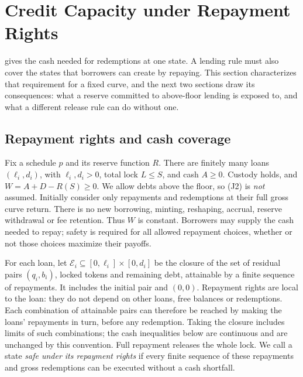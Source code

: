 \section{Credit Capacity under Repayment Rights}\label{sec:credit}

 gives the cash needed for redemptions at one state. A lending rule must also cover the states that borrowers can create by repaying. This section characterizes that requirement for a fixed curve, and the next two sections draw its consequences: what a reserve committed to above-floor lending is exposed to, and what a different release rule can do without one.

\subsection{Repayment rights and cash coverage}\label{cr:rights}

Fix a schedule $p$ and its reserve function $R$. There are finitely many loans $(\ell_i,d_i)$, with $\ell_i,d_i>0$, total lock $L\le S$, and cash $A\ge0$. Custody holds, and $W=A+D-R(S)\ge0$. We allow debts above the floor, so (J2) is \emph{not} assumed. Initially consider only repayments and redemptions at their full gross curve return. There is no new borrowing, minting, reshaping, accrual, reserve withdrawal or fee retention. Thus $W$ is constant. Borrowers may supply the cash needed to repay; safety is required for all allowed repayment choices, whether or not those choices maximize their payoffs.

For each loan, let $\mathcal E_i\subseteq[0,\ell_i]\times[0,d_i]$ be the closure of the set of residual pairs $(q_i,b_i)$, locked tokens and remaining debt, attainable by a finite sequence of repayments. It includes the initial pair and $(0,0)$. Repayment rights are local to the loan: they do not depend on other loans, free balances or redemptions. Each combination of attainable pairs can therefore be reached by making the loans' repayments in turn, before any redemption. Taking the closure includes limits of such combinations; the cash inequalities below are continuous and are unchanged by this convention. Full repayment releases the whole lock. We call a state \emph{safe under its repayment rights} if every finite sequence of these repayments and gross redemptions can be executed without a cash shortfall.

